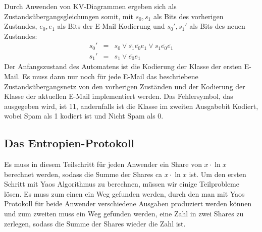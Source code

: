\documentclass{article}
\begin{document}
Durch Anwenden von KV-Diagrammen ergeben sich als Zustands\"ubergangsgleichungen
somit, mit \(s_0, s_1\) als Bits des vorherigen Zustandes, \(e_0, e_1\) als Bits
der E-Mail Kodierung und \(s_0', s_1'\) als Bits des neuen Zustandes:
\begin{align*}
s_0' &=& s_0 \vee \overline{s_1} \overline{e_0} e_1
           \vee s_1 \overline{e_0} \overline{e_1}\\
s_1' &=& s_1 \vee \overline{e_0} e_1
\end{align*}
Der Anfangszustand des Automatens ist die Kodierung der Klasse der ersten E-Mail.
Es muss dann nur noch f\"ur jede E-Mail das beschriebene Zustands\"ubergangsnetz
von den vorherigen Zust\"anden und der Kodierung der Klasse der aktuellen
E-Mail implementiert werden. Das Fehlersymbol, das ausgegeben wird, ist 11,
andernfalls ist die Klasse im zweiten Ausgabebit Kodiert, wobei Spam als 1 
kodiert ist und Nicht Spam als 0.

\subsection{Das Entropien-Protokoll}
Es muss in diesem Teilschritt f\"ur jeden Anwender ein Share von
 \(x\cdot \ln x\) berechnet werden, sodass die Summe der Shares
 ca \(x \cdot \ln x\) ist.
Um den ersten Schritt mit Yaos Algorithmus zu berechnen, m\"ussen
wir einige Teilprobleme l\"osen. Es muss zum einen ein Weg gefunden
werden, durch den man mit Yaos Protokoll f\"ur beide Anwender
verschiedene Ausgaben produziert werden k\"onnen und zum zweiten muss
ein Weg gefunden werden, eine Zahl in zwei Shares zu zerlegen, sodass die
Summe der Shares wieder die Zahl ist.
\end{document}
